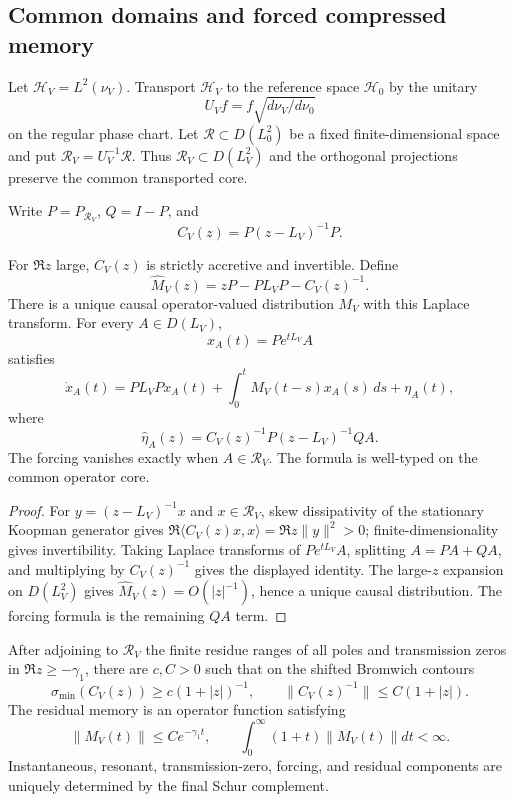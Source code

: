 \subsection{Common domains and forced compressed memory}

Let \(\mathcal H_V=L^2(\nu_V)\).  Transport \(\mathcal H_V\) to the reference
space \(\mathcal H_0\) by the unitary
\[
 U_Vf=f\sqrt{d\nu_V/d\nu_0}
\]
on the regular phase chart.  Let \(\mathcal R\subset D(L_0^2)\) be a fixed
finite-dimensional space and put
\(\mathcal R_V=U_V^{-1}\mathcal R\).  Thus
\(\mathcal R_V\subset D(L_V^2)\) and the orthogonal projections preserve the
common transported core.

Write \(P=P_{\mathcal R_V}\), \(Q=I-P\), and
\[
 C_V(z)=P(z-L_V)^{-1}P.
\]

\begin{theorem}
\label{thm:r16-a4-memory}
For \(\Re z\) large, \(C_V(z)\) is strictly accretive and invertible.  Define
\[
 \widehat M_V(z)=zP-PL_VP-C_V(z)^{-1}.
\]
There is a unique causal operator-valued distribution \(M_V\) with this
Laplace transform.  For every \(A\in D(L_V)\),
\[
 x_A(t)=Pe^{tL_V}A
\]
satisfies
\[
 \dot x_A(t)=PL_VP x_A(t)
 +\int_0^tM_V(t-s)x_A(s)\,ds+\eta_A(t),
\]
where
\[
 \widehat\eta_A(z)
 =C_V(z)^{-1}P(z-L_V)^{-1}QA.
\]
The forcing vanishes exactly when \(A\in\mathcal R_V\).  The formula is
well-typed on the common operator core.
\end{theorem}

\begin{proof}
For \(y=(z-L_V)^{-1}x\) and \(x\in\mathcal R_V\), skew dissipativity of the
stationary Koopman generator gives
\(\Re\langle C_V(z)x,x\rangle=\Re z\|y\|^2>0\); finite-dimensionality gives
invertibility.  Taking Laplace transforms of \(Pe^{tL_V}A\), splitting
\(A=PA+QA\), and multiplying by \(C_V(z)^{-1}\) gives the displayed identity.
The large-\(z\) expansion on \(D(L_V^2)\) gives
\(\widehat M_V(z)=O(|z|^{-1})\), hence a unique causal distribution.  The
forcing formula is the remaining \(QA\) term.
\end{proof}

\begin{theorem}
\label{thm:r16-a4-descriptor}
After adjoining to \(\mathcal R_V\) the finite residue ranges of all poles and
transmission zeros in \(\Re z\ge-\gamma_1\), there are \(c,C>0\) such that on
the shifted Bromwich contours
\[
 \sigma_{\min}(C_V(z))\ge c(1+|z|)^{-1},
 \qquad
 \|C_V(z)^{-1}\|\le C(1+|z|).
\]
The residual memory is an operator function satisfying
\[
 \|M_V(t)\|\le Ce^{-\gamma_1t},
 \qquad
 \int_0^\infty(1+t)\|M_V(t)\|dt<\infty.
\]
Instantaneous, resonant, transmission-zero, forcing, and residual components
are uniquely determined by the final Schur complement.
\end{theorem}


